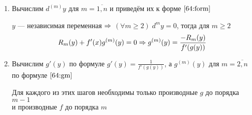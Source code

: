 \documentclass{article}
\begin{document}
\begin{enumerate}
	\item{}Вычислим $d^{(m)}y$ для $m=\overline{1,n}$ и приведём их к форме $\eqref{64:form}$

	$y$ --- независимая переменная $\Rightarrow$ $(\forall m\geq 2)\;d^{m}y=0$, тогда для $m\geq 2$
	\begin{align}
		R_{m}(y)+f'(x)g^{(m)}(y)=0\Rightarrow g^{(m)}(y)=\frac{-R_{m}(y)}{f'(g(y))}\label{64:gm}
	\end{align}

	\item{}Вычислим $g'(y)$ по формуле $g'(y)=\frac{1}{f'(g(y))}$, а $g^{(m)}(y)$ для $m=\overline{2,n}$ по формуле $\eqref{64:gm}$

	Для каждого из этих шагов необходимы только производные $g$ до порядка $m-1$\\
	и производные $f$ до порядка $m$
\end{enumerate}
\end{document}
